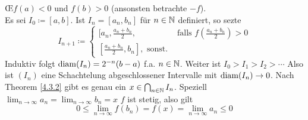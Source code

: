 \begin{subproof}
	\OE $ f(a) < 0 $ und $ f(b) > 0 $ (ansonsten betrachte $ -f $).\\
	Es sei $ I_0 \coloneqq [a, b] $.
	Ist $ I_n = [a_n, b_n] $ für $ n \in \mathbb{N}  $ definiert, so sezte
	\[
		I_{n+1} \coloneqq \begin{cases}
			[a_n, \frac{ a_n + b_n }{ 2 } , & \text{ falls } f\left(\frac{ a_n + b_n }{ 2 }\right)  > 0 \\
			[\frac{ a_n + b_n }{ 2 } , b_n], \text{ sonst.} 
		\end{cases}
	\]
	Induktiv folgt $ \operatorname{diam}(I_n) = 2^{-n}(b - a) $ f.a. $ n \in \mathbb{N}  $. Weiter ist $ I_0 > I_1 > I_2 > \dotsb $ Also ist $ (I_n) $ eine Schachtelung abgeschlossener Intervalle mit $ \operatorname{diam}(I_n) \to 0 $. Nach Theorem \ref{4.3.2} gibt es genau ein $ x \in \bigcap_{n \in \mathbb{N} } I_n $.
	Speziell $ \lim_{n \to \infty} a_n = \lim_{n \to \infty} b_n = x $ $ f  $ ist stetig, also gilt 
	\[
		0 \leq \lim_{n \to \infty} f(b_n) = f(x) = \lim_{n \to \infty} a_n \leq  0
	\]
	
\end{subproof}

